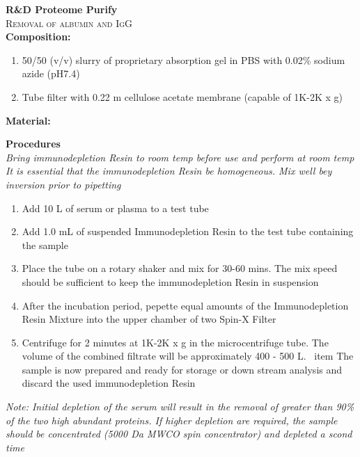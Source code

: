 \textbf{R&D Proteome Purify} 
\\
\textsc{Removal of albumin and IgG}
\\
\textbf{Composition:} 
\begin{enumerate}
    \item{50/50 (v/v) slurry of proprietary absorption gel in PBS with 0.02\% sodium azide (pH7.4)}
    \item{Tube filter with 0.22 \mu m cellulose acetate membrane (capable of 1K-2K x g)}
\end{enumerate}

\textbf{Material:}
\\
\begin{enumerate}
    \item {Microcentrifuge 1K -2K X g}
    \item {Microcentrifuge tubes 1 mL}
    \item {
\end{enumerate}

\textbf{Procedures}
\\
\textit{Bring immunodepletion Resin to room temp before use and perform at room temp} \\
\textit{It is essential that the immunodepletion Resin be homogeneous. Mix well bey inversion prior to pipetting}
\begin{enumerate}
    \item {Add 10 \mu L of serum or plasma to a test tube}
    \item {Add 1.0 mL of suspended Immunodepletion Resin to the test tube containing the sample}
    \item {Place the tube on a rotary shaker and mix for 30-60 mins. The mix speed should be sufficient to keep the immunodepletion Resin in suspension}
    \item {After the incubation period, pepette equal amounts of the Immunodepletion Resin Mixture into the upper chamber of two Spin-X Filter}
    \item {Centrifuge for 2 minutes at 1K-2K x g in the microcentrifuge tube. The volume of the combined filtrate will be approximately 400 - 500 \mu L.}
    \ item {The sample is now prepared and ready for storage or down stream analysis and discard the used immunodepletion Resin}
\end{enumerate}
\footnotesize
\textit{Note: Initial depletion of the serum will result in the removal of greater than 90\% of the two high abundant proteins. If higher depletion are required, the sample should be concentrated (5000 Da MWCO spin concentrator) and depleted a scond time}
